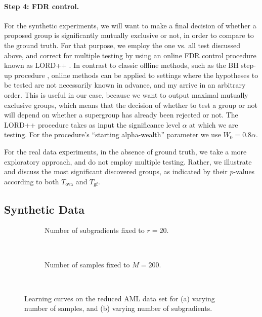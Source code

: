 \paragraph{Step 4: FDR control.}
For the synthetic experiments, we will want to make a final decision of whether a proposed group is significantly mutually exclusive or not, in order to compare to the ground truth.
For that purpose, we employ the one vs. all test discussed above, and correct for multiple testing by using an online FDR control procedure known as LORD++ \citep{lordpp,lord}.
In contrast to classic offline methods, such as the BH step-up procedure \citep{bh}, online methods can be applied to settings where the hypotheses to be tested are not necessarily known in advance, and my arrive in an arbitrary order.
This is useful in our case, because we want to output maximal mutually exclusive groups, which means that the decision of whether to test a group or not will depend on whether a supergroup has already been rejected or not.
The LORD++ procedure takes as input the significance level $\alpha$ at which we are testing.
For the procedure's ``starting alpha-wealth'' parameter we use $W_0 = 0.8\alpha$.

For the real data experiments, in the absence of ground truth, we take a more exploratory approach, and do not employ multiple testing.
Rather, we illustrate and discuss the most significant discovered groups, as indicated by their $p$-values according to both $T_{\mathrm{ova}}$ and $T_{\mathrm{gf}}$.

\subsection{Synthetic Data}

\setlength{}
\setlength{}
\renewcommand{\subflen}{\textwidth}
\renewcommand{\scspacey}{-0.3em}
\renewcommand{\scspacex}{0.2em}
\begin{figure}[htb]
  \centering
  \begin{subfigure}[b]{\subflen}
    \centering
    
    \caption{Number of subgradients fixed to $r = 20$.}
    \label{fig:syn_nsubg}
  \end{subfigure}\\[2em]
  \begin{subfigure}[b]{\subflen}
    \centering
    
    \caption{Number of samples fixed to $M = 200$.}
    \label{fig:syn_nsamples}
  \end{subfigure}\\[1em]
  \caption{
    Learning curves on the reduced AML data set for (a) varying number of samples, and (b) varying number of subgradients.
  }
  \label{fig:syn1}
\end{figure}


